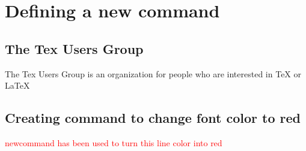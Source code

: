 \section{Defining a new command}

\newcommand{\TUG}{Tex Users Group}

\subsection{The \TUG}
The \TUG{} is an organization for people who  are interested in \TeX{} or \LaTeX

\subsection{Creating command to change font color to red}
\newcommand{\red}[1]{\textcolor{red}{#1}}

\red{newcommand  has been used to turn this line color into red}